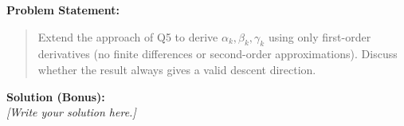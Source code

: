 \documentclass[12pt]{article}
\begin{document}
\noindent
\textbf{Problem Statement:}
\begin{quote}
Extend the approach of Q5 to derive $\alpha_k, \beta_k, \gamma_k$ using only first-order derivatives (no finite differences or second-order approximations). Discuss whether the result always gives a valid descent direction.
\end{quote}

\noindent
\textbf{Solution (Bonus):} \\
\emph{[Write your solution here.]}

\bigskip

\end{document}
